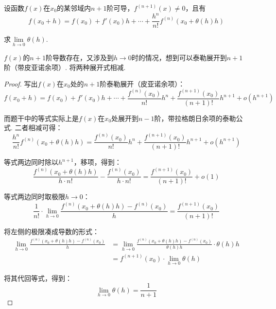 \begin{example}
\label{ex:ch04-50}
设函数$f(x)$在$x_0$的某邻域内$n+1$阶可导，$f^{(n+1)}(x) \ne 0$，且有
$$
f(x_0 + h) = f(x_0) + f'(x_0)h + \cdots + \frac{h^n}{n!}f^{(n)}(x_0 + \theta(h)h)
$$

求$\lim\limits_{h \to 0} \theta(h)$.
\end{example}

\begin{analysis}
$f(x)$的$n+1$阶导数存在，又涉及到$h \to 0$时的情况，想到可以泰勒展开到$n+1$阶（带皮亚诺余项）.
将两种展开式相减.
\end{analysis}

\begin{proof}
写出$f(x)$在$x_0$处的$n+1$阶泰勒展开（皮亚诺余项）：
$$
f(x_0 + h) = f(x_0) + f'(x_0)h + \cdots + \frac{f^{(n)}(x_0)}{n!} h^n + \frac{f^{(n+1)}(x_0)}{(n+1)!} h^{n+1} + o(h^{n+1})
$$\par
而题干中的等式实际上是$f(x)$在$x_0$处展开到$n-1$阶，带拉格朗日余项的泰勒公式.
二者相减可得：
$$
\frac{h^n}{n!}f^{(n)}(x_0 + \theta(h)h) = \frac{f^{(n)}(x_0)}{n!} h^n + \frac{f^{(n+1)}(x_0)}{(n+1)!} h^{n+1} + o(h^{n+1})
$$\par
等式两边同时除以$h^{n+1}$，移项，得到：
$$
\frac{f^{(n)}(x_0 + \theta(h)h)}{h \cdot n!} - \frac{f^{(n)}(x_0)}{h \cdot n!} = \frac{f^{(n+1)}(x_0)}{(n+1)!} + o(1)
$$\par
等式两边同时取极限$h \to 0$：
$$
\frac{1}{n!} \cdot \lim\limits_{h \to 0} \frac{f^{(n)}(x_0 + \theta(h)h) - f^{(n)}(x_0)}{h}
= \frac{f^{(n+1)}(x_0)}{(n+1)!}
$$\par
将左侧的极限凑成导数的形式：
\begin{equation}
    \begin{aligned}
        \lim\limits_{h \to 0} \frac{f^{(n)}(x_0 + \theta(h)h) - f^{(n)}(x_0)}{h}
        &= \lim\limits_{h \to 0} \frac{f^{(n)}(x_0 + \theta(h)h) - f^{(n)}(x_0)}{\theta(h)h} \cdot \theta(h)h \\
        &= f^{(n+1)}(x_0) \cdot \lim\limits_{h \to 0} \theta(h)
        \nonumber
    \end{aligned}
\end{equation}

将其代回等式，得到：
$$
\lim\limits_{h \to 0} \theta(h) = \frac{1}{n+1}
$$
\end{proof}

